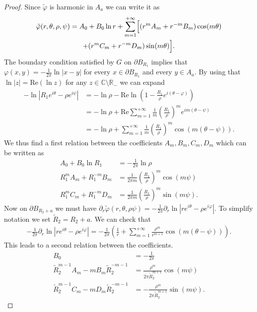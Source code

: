 \documentclass[12pt,reqno]{amsart}
\newcommand{\RE}{\text{Re}}
\def \p {\partial}
\newcommand{\R}{\mathbb{R}}
\numberwithin{equation}{section}
\begin{document}
\begin{proof}
Since \(\tilde{\varphi}\) is harmonic in \(A_a\) we can write it as 
\begin{multline*}
\tilde{\varphi}(r,\theta,\rho,\psi) =A_0+B_0\ln r +\sum_{m=1}^{+\infty} \Bigl[ (r^mA_m+r^{-m}B_m)\cos (m\theta) \\
 +(r^mC_m+r^{-m}D_m)\sin (m\theta) \Bigr].
\end{multline*}
The boundary condition satisfied by \(G\) on \(\p B_{R_1}\) implies that \(\varphi(x,y)=-\frac{1}{2\pi}\ln |x-y|\) for every \(x\in \p B_{R_1}\) and every \(y \in A_a\). By using that \(\ln |z| =\text{Re} (\ln z)\) for any \(z\in \mathbb{C}\setminus \R_{-}\) we can expand
\begin{align*}
-\ln |R_1e^{i\theta}-\rho e^{i\psi}|&=-\ln \rho -\RE \ln \left(1-\frac{R_1}{\rho}e^{i(\theta-\varphi)}\right) \\
&=  -\ln \rho +\RE \sum_{m=1}^{+\infty} \frac{1}{m}\left(\frac{R_1}{\rho} \right)^m e^{im(\theta -\psi)} \\
&=-\ln \rho+\sum_{m=1}^{+\infty}  \frac{1}{m}\left(\frac{R_1}{\rho} \right)^m \cos (m(\theta-\psi)).
\end{align*}
We thus find a first relation between the coefficients \(A_m,B_m,C_m,D_m\) which can be written as
\begin{align*}
A_0+B_0\ln R_1 &=-\frac{1}{2\pi}\ln \rho \\
R_1^mA_m+R_1^{-m}B_m &= \frac{1}{2\pi m}\left(\frac{R_1}{\rho} \right)^m \cos (m\psi) \\
R_1^mC_m+R_1^{-m}D_m &= \frac{1}{2\pi m}\left(\frac{R_1}{\rho} \right)^m \sin (m\psi).
\end{align*}
Now on \(\p B_{R_2+a}\) we must have \(\p_r \tilde{\varphi}(r,\theta, \rho \psi)=-\frac{1}{2\pi}\p_r \ln |re^{i\theta}-\rho e^{i\varphi}|\). To simplify notation we set \(\tilde{R}_2=R_2+a\). We can check that 
\begin{align*}
-\frac{1}{2\pi}\p_r \ln |re^{i\theta}-\rho e^{i\varphi}| =-\frac{1}{2\pi}\left(\frac{1}{r}+\sum_{m=1}^{+\infty} \frac{\rho^m}{r^{m+1}}\cos (m(\theta-\psi)) \right).
\end{align*}
This leads to a second relation between the coefficients.
\begin{align*}
B_0&= -\frac{1}{2\pi} \\
\tilde{R}_2^{m-1} A_m-mB_m\tilde{R}_2^{-m-1} &=\frac{\rho^m}{2\pi \tilde{R}_2^{m+1}}\cos(m\psi) \\
\tilde{R}_2^{m-1} C_m-mD_m\tilde{R}_2^{-m-1} &=-\frac{\rho^m}{2\pi \tilde{R}_2^{m+1}}\sin (m\psi). 

\end{align*}
\end{proof}
\end{document}
